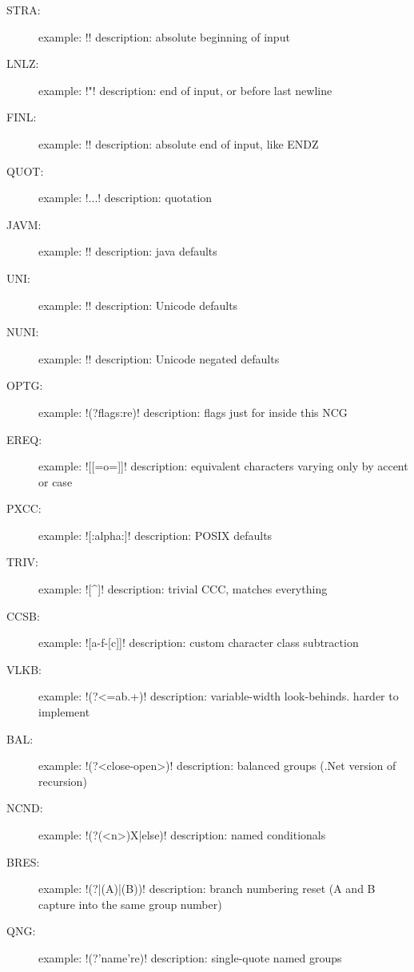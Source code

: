 \begin{description}
\item[STRA:] example: \cverb!\A! description: absolute beginning of input
\item[LNLZ:] example: \cverb!\Z"! description: end of input, or before last newline
\item[FINL:] example: \cverb!\z! description: absolute end of input, like ENDZ
\item[QUOT:] example: \cverb!\Q...\E! description: quotation
\item[JAVM:] example: \cverb!! description: java defaults
\item[UNI:] example: \cverb!\pL! description: Unicode defaults
\item[NUNI:] example: \cverb!\PS! description: Unicode negated defaults
\item[OPTG:] example: \cverb!(?flags:re)! description: flags just for inside this NCG
\item[EREQ:] example: \cverb![[=o=]]! description: equivalent characters varying only by accent or case
\item[PXCC:] example: \cverb![:alpha:]! description: POSIX defaults
\item[TRIV:] example: \cverb![^]! description: trivial CCC, matches everything
\item[CCSB:] example: \cverb![a-f-[c]]! description: custom character class subtraction
\item[VLKB:] example: \cverb!(?<=ab.+)! description: variable-width look-behinds.  harder to implement
\item[BAL:] example: \cverb!(?<close-open>)! description:  balanced groups (.Net version of recursion)
\item[NCND:] example: \cverb!(?(<n>)X|else)! description: named conditionals
\item[BRES:] example: \cverb!(?|(A)|(B))! description: branch numbering reset (A and B capture into the same group number)
\item[QNG:] example: \cverb!(?'name're)! description: single-quote named groups
\end{description}

